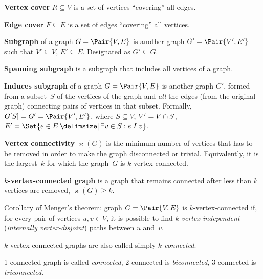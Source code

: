\documentclass[a4paper,10pt]{article}
\newcommand{\vertexConnectivity}[1]{\varkappa(#1)}
\begin{document}
\begin{terms}
    \item \textbf{Vertex cover} $R \subseteq V$ is a set of vertices \enquote{covering} all edges.

    \item \textbf{Edge cover} $F \subseteq E$ is a set of edges \enquote{covering} all vertices.

    \item \textbf{Subgraph} of a graph $G = \Pair{V,E}$ is another graph $G' = \Pair{V',E'}$ such that $V' \subseteq V$, $E' \subseteq E$. Designated as $G' \subseteq G$.

    \item \textbf{Spanning subgraph} is a subgraph that includes all vertices of a graph.

    \item \textbf{Induces subgraph} of a graph $G = \Pair{V,E}$ is another graph $G'$, formed from a subset~$S$ of the vertices of the graph and \emph{all} the edges (from the original graph) connecting pairs of vertices in that subset.
    Formally, $G[S] = G' = \Pair{V',E'}$, where $S \subseteq V$, $V' = V \cap S$, $E' = \Set{e \in E \given \exists v \in S: e \mathrel{I} v}$.

    \item \textbf{Vertex connectivity} $\vertexConnectivity{G}$ is the minimum number of vertices that has to be removed in order to make the graph disconnected or trivial.
    Equivalently, it is the largest~$k$ for which the graph~$G$ is $k$-vertex-connected.

    \item \textbf{$k$-vertex-connected graph} is a graph that remains connected after less than $k$ vertices are removed, \ie $\vertexConnectivity{G} \geq k$.
    \begin{terms}
        \item Corollary of Menger's theorem: graph $G = \Pair{V,E}$ is $k$-vertex-connected if, for every pair of vertices $u,v \in V$, it is possible to find $k$ \emph{vertex-independent} (\emph{internally vertex-disjoint}) paths between $u$ and~$v$.
        \item $k$-vertex-connected graphs are also called simply \emph{$k$-connected}.
        \item 1-connected graph is called \emph{connected}, 2-connected is \emph{biconnected}, 3-connected is \emph{triconnected}.
    \end{terms}


\end{terms}
\end{document}
